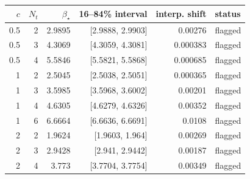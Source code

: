 \begin{tabular}{rrrrrl}
\toprule
$c$ & $N_t$ & $\beta_\star$ & 16--84\% interval & interp. shift & status\\\midrule
0.5 & 2 & 2.9895 & [2.9888, 2.9903] & 0.00276 & flagged\\
0.5 & 3 & 4.3069 & [4.3059, 4.3081] & 0.000383 & flagged\\
0.5 & 4 & 5.5846 & [5.5821, 5.5868] & 0.000685 & flagged\\
1 & 2 & 2.5045 & [2.5038, 2.5051] & 0.000365 & flagged\\
1 & 3 & 3.5985 & [3.5968, 3.6002] & 0.00201 & flagged\\
1 & 4 & 4.6305 & [4.6279, 4.6326] & 0.00352 & flagged\\
1 & 6 & 6.6664 & [6.6636, 6.6691] & 0.0108 & flagged\\
2 & 2 & 1.9624 & [1.9603, 1.964] & 0.00269 & flagged\\
2 & 3 & 2.9428 & [2.941, 2.9442] & 0.00187 & flagged\\
2 & 4 & 3.773 & [3.7704, 3.7754] & 0.00349 & flagged\\
\bottomrule
\end{tabular}
